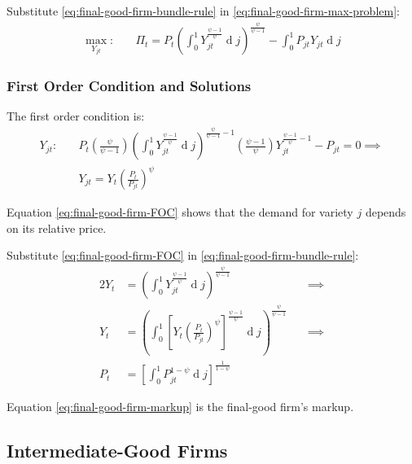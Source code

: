 \documentclass[
	12pt, 
	]{article}
\numberwithin{equation}{section}
\DeclareMathOperator{\dif}{d}
\theoremstyle{definition}
\theoremstyle{plain}
\theoremstyle{plain}
\theoremstyle{plain}
\begin{document}
Substitute \ref{eq:final-good-firm-bundle-rule} in \ref{eq:final-good-firm-max-problem}:
\begin{align}
\label{eq:final-good-firm-max-problem-2}
	\max_{Y_{jt}}: & \quad \Pi_t = P_t \left( \int_{0}^{1} Y_{jt}^{\frac{\psi-1}{\psi}} \dif j \right)^{\frac{\psi}{\psi-1}} - \int_{0}^{1} P_{jt} Y_{jt} \dif j
\end{align}

\subsubsection*{First Order Condition and Solutions}

The first order condition is:
\begin{align}
	Y_{jt}:\quad & P_t \left( \frac{\psi}{\psi-1} \right) \left( \int_{0}^{1} Y_{jt}^{\frac{\psi-1}{\psi}} \dif j \right)^{\frac{\psi}{\psi-1}-1} \left( \frac{\psi-1}{\psi} \right) Y_{jt}^{\frac{\psi-1}{\psi}-1} - P_{jt} = 0 \implies \nonumber \\
\label{eq:final-good-firm-FOC}
	& Y_{jt} = Y_t \left( \frac{P_t}{P_{jt}} \right)^{\psi}
\end{align}

Equation \ref{eq:final-good-firm-FOC} shows that the demand for variety $j$ depends on its relative price. 

Substitute \ref{eq:final-good-firm-FOC} in \ref{eq:final-good-firm-bundle-rule}:
\begin{alignat}{2}
	Y_t & = \left( \int_{0}^{1} Y_{jt}^{\frac{\psi-1}{\psi}} \dif j \right)^{\frac{\psi}{\psi-1}} &\implies \nonumber \\
	Y_t & = \left( \int_{0}^{1} \left[ Y_t \left( \frac{P_t}{P_{jt}} \right)^{\psi} \right]^{\frac{\psi-1}{\psi}} \dif j \right)^{\frac{\psi}{\psi-1}} \quad &\implies \nonumber \\
	P_t & = \left[ \int_{0}^{1} P_{jt}^{1-\psi} \dif j \right]^{\frac{1}{1-\psi}} \label{eq:final-good-firm-markup}
\end{alignat}

Equation \ref{eq:final-good-firm-markup} is the final-good firm's markup.


\subsection{Intermediate-Good Firms}
\end{document}
